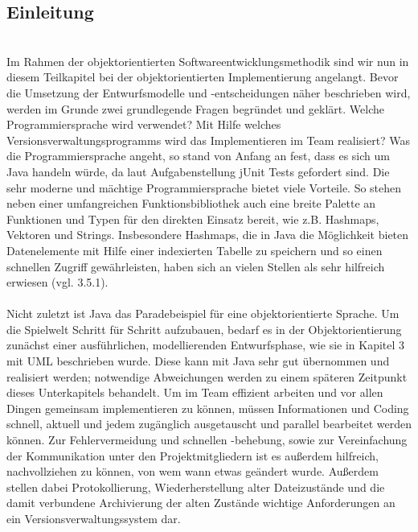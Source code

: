 \subsection{Einleitung}
\label{sub:fachkonzept-implementierung-einleitung}

\\
Im Rahmen der objektorientierten Softwareentwicklungsmethodik sind wir nun in diesem Teilkapitel bei der objektorientierten Implementierung angelangt. Bevor die Umsetzung der Entwurfsmodelle und -entscheidungen näher beschrieben wird, werden im Grunde zwei grundlegende Fragen begründet und geklärt. Welche Programmiersprache wird verwendet? Mit Hilfe welches Versionsverwaltungsprogramms wird das Implementieren im Team realisiert?
Was die Programmiersprache angeht, so stand von Anfang an fest, dass es sich um Java handeln würde, da laut Aufgabenstellung jUnit Tests gefordert sind. Die sehr moderne und mächtige Programmiersprache bietet viele Vorteile. So stehen neben einer umfangreichen Funktionsbibliothek auch eine breite Palette an Funktionen und Typen für den direkten Einsatz bereit, wie z.B. Hashmaps, Vektoren und Strings. Insbesondere Hashmaps, die in Java die Möglichkeit bieten Datenelemente mit Hilfe einer indexierten Tabelle zu speichern und so einen schnellen Zugriff gewährleisten, haben sich an vielen Stellen als sehr hilfreich erwiesen (vgl. 3.5.1). 
\\
\\
Nicht zuletzt ist Java das Paradebeispiel für eine objektorientierte Sprache. Um die Spielwelt Schritt für Schritt aufzubauen, bedarf es in der Objektorientierung zunächst einer ausführlichen, modellierenden Entwurfsphase, wie sie in Kapitel 3 mit UML beschrieben wurde. Diese kann mit Java sehr gut übernommen und realisiert werden; notwendige Abweichungen werden zu einem späteren Zeitpunkt dieses Unterkapitels behandelt. 
Um im Team effizient arbeiten und vor allen Dingen gemeinsam implementieren zu können, müssen Informationen und Coding schnell, aktuell und jedem zugänglich ausgetauscht und parallel bearbeitet werden können. Zur Fehlervermeidung und schnellen -behebung, sowie zur Vereinfachung der Kommunikation unter den Projektmitgliedern ist es außerdem hilfreich, nachvollziehen zu können, von wem wann etwas geändert wurde. Außerdem stellen dabei Protokollierung, Wiederherstellung alter Dateizustände und die damit verbundene Archivierung der alten Zustände wichtige Anforderungen an ein Versionsverwaltungssystem dar. 
\\
\\
